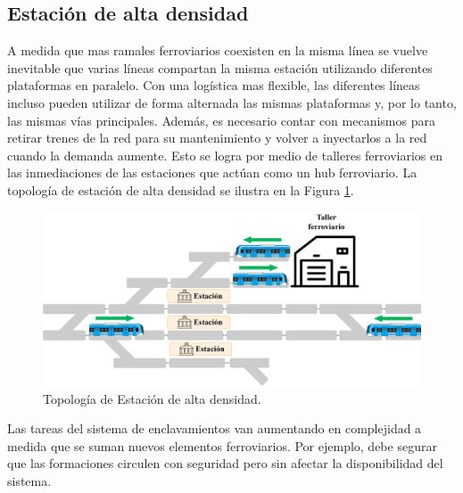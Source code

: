 \subsection{Estación de alta densidad}

A medida que mas ramales ferroviarios coexisten en la misma línea se vuelve inevitable que varias líneas compartan la misma estación utilizando diferentes plataformas en paralelo. Con una logística mas flexible, las diferentes líneas incluso pueden utilizar de forma alternada las mismas plataformas y, por lo tanto, las mismas vías principales. Además, es necesario contar con mecanismos para retirar trenes de la red para su mantenimiento y volver a inyectarlos a la red cuando la demanda aumente. Esto se logra por medio de talleres ferroviarios en las inmediaciones de las estaciones que actúan como un hub ferroviario. La topología de estación de alta densidad se ilustra en la Figura \ref{fig:hub_1}.

    \begin{figure}[h]
        \centering
        \includegraphics[width=1\textwidth]{Figuras/altaDensidad}
        \centering\caption{Topología de Estación de alta densidad.}
        \label{fig:hub_1}
    \end{figure}
    

Las tareas del sistema de enclavamientos van aumentando en complejidad a medida que se suman nuevos elementos ferroviarios. Por ejemplo, debe segurar que las formaciones circulen con seguridad pero sin afectar la disponibilidad del sistema. %